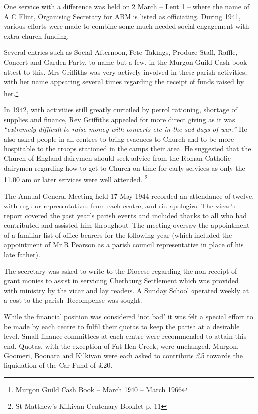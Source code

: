 One service with a difference was held on 2 March -- Lent 1 -- where the name of A C Flint, Organising Secretary for ABM is listed as officiating. During 1941, various efforts were made to combine some much-needed social engagement with extra church funding.



Several entries such as Social Afternoon, Fete Takings, Produce Stall, Raffle, Concert and Garden Party, to name but a few, in the Murgon Guild Cash book attest to this. Mrs Griffiths was very actively involved in these parish activities, with her name appearing several times regarding the receipt of funds raised by her.\footnote{Murgon Guild Cash Book -- March 1940 -- March 1966}


In 1942, with activities still greatly curtailed by petrol rationing, shortage of supplies and finance, Rev Griffiths appealed for more direct giving as it was \emph{``extremely difficult to raise money with concerts etc in the sad days of war.''} He also asked people in all centres to bring evacuees to Church and to be more hospitable to the troops stationed in the camps their area. He suggested that the Church of England dairymen should seek advice from the Roman Catholic dairymen regarding how to get to Church on time for early services as only the 11.00 am or later services were well attended. \footnote{St Matthew's Kilkivan Centenary Booklet p. 11}


The Annual General Meeting held 17 May 1944 recorded an attendance of twelve, with regular representatives from each centre, and six apologies. The vicar's report covered the past year's parish events and included thanks to all who had contributed and assisted him throughout. The meeting oversaw the appointment of a familiar list of office bearers for the following year (which included the appointment of Mr R Pearson as a parish council representative in place of his late father).



The secretary was asked to write to the Diocese regarding the non-receipt of grant monies to assist in servicing Cherbourg Settlement which was provided with ministry by the vicar and lay readers. A Sunday School operated weekly at a cost to the parish. Recompense was sought.



While the financial position was considered `not bad' it was felt a special effort to be made by each centre to fulfil their quotas to keep the parish at a desirable level. Small finance committees at each centre were recommended to attain this end. Quotas, with the exception of Fat Hen Creek, were unchanged. Murgon, Goomeri, Boonara and Kilkivan were each asked to contribute \pounds5 towards the liquidation of the Car Fund of \pounds20.




